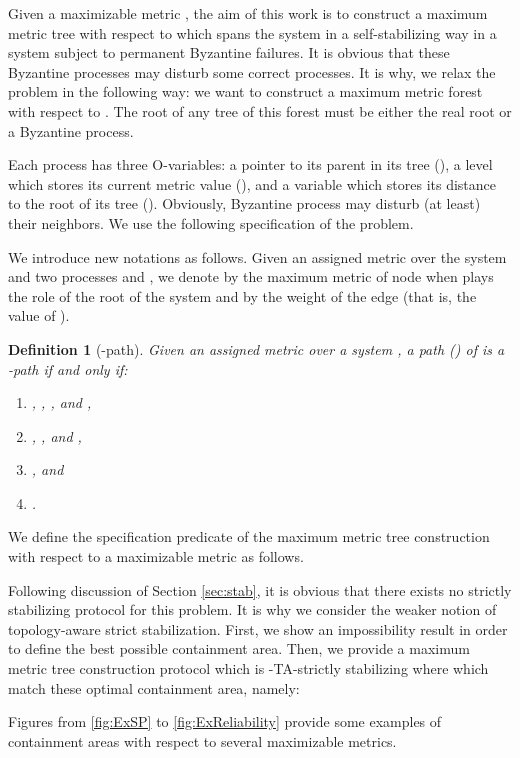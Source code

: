 \documentclass[11pt]{article}
\newtheorem{defi}{Definition}
\newenvironment{definition}[1]{\vspace{-0.25cm}\begin{defi}#1}{\end{defi}\vspace{-0.3cm}}
\begin{document}
Given a maximizable metric , the aim of this work is to construct a maximum metric tree with respect to  which spans the system in a self-stabilizing way in a system subject to permanent Byzantine failures. It is obvious that these Byzantine processes may disturb some correct processes. It is why, we relax the problem in the following way: we want to construct a maximum metric forest with respect to . The root of any tree of this forest must be either the real root or a Byzantine process. 

Each process  has three O-variables: a pointer to its parent in its tree (), a level which stores its current metric value (), and a variable which stores its distance to the root of its tree (). Obviously, Byzantine process may disturb (at least) their neighbors. We use the following specification of the problem.

We introduce new notations as follows. Given an assigned metric  over the system  and two processes  and , we denote by  the maximum metric of node  when  plays the role of the root of the system and by  the weight of the edge  (that is, the value of ).

\begin{definition}[-path]
Given an assigned metric  over a system , a path  () of  is a \emph{-path} if and only if:
\begin{enumerate}
\item , , , and ,
\item , , and ,
\item , and
\item .
\end{enumerate}
\end{definition}

We define the specification predicate  of the maximum metric tree construction with respect to a maximizable metric  as follows.


Following discussion of Section \ref{sec:stab}, it is obvious that there exists no strictly stabilizing protocol for this problem. It is why we consider the weaker notion of topology-aware strict stabilization. First, we show an impossibility result in order to define the best possible containment area. Then, we provide a maximum metric tree construction protocol which is -TA-strictly stabilizing where  which match these optimal containment area, namely:



Figures from \ref{fig:ExSP} to \ref{fig:ExReliability} provide some examples of containment areas with respect to several maximizable metrics.
\end{document}
